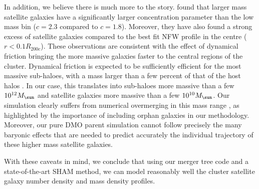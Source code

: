 In   addition,    we   believe   there    is   much   more    to   the
story. \citet{vanderburgEvidenceInsideoutGrowth2015} found that larger
mass  satellite galaxies  have  a  significantly larger  concentration
parameter   than    the   low   mass   bin    ($c=2.3$   compared   to
$c=1.8$). Moreover, they have also  found a strong excess of satellite
galaxies compared to the best fit NFW  profile in the centre ($r < 0.1
R_{200c}$).   These observations  are  consistent with  the effect  of
dynamical friction  bringing the more  massive galaxies faster  to the
central regions of  the cluster. Dynamical friction is  expected to be
sufficiently efficient  for the  most massive  sub-haloes, with  a mass
larger than a few  percent of that of the host  halos 
\citep[e.g.][]{binneyGalacticDynamicsSecond2008,Mo}. 
In our case, this  translates into
sub-haloes  more  massive  than  a  few  $10^{12}\msol$  and  satellite
galaxies  more  massive than  a  few  $10^{10}\msol$.  Our  simulation
clearly suffers from  numerical overmerging in this  mass range 
\citep{vandenboschDisruptionDarkMatter2018}, as highlighted  by the 
importance of including  orphan galaxies in
our  methodology.  Moreover,  our  pure DMO  parent simulation  cannot
follow precisely the many baryonic  effects that are needed to predict
accurately the  individual trajectory  of these higher  mass satellite
galaxies.

With these  caveats in mind,  we conclude  that using our  merger tree
code and a  state-of-the-art SHAM method, we can  model reasonably well
the cluster satellite galaxy number density and mass density profiles.
